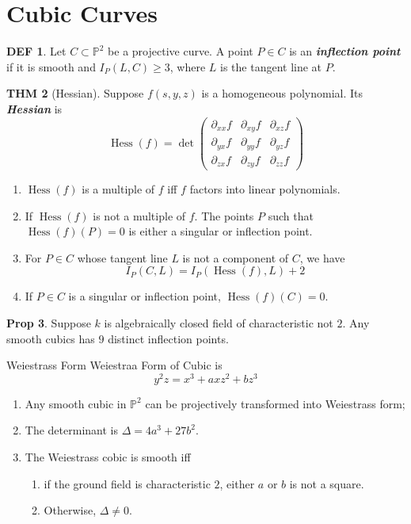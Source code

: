 \documentclass[twocolumn]{article}
\renewcommand{\emph}[1]{\textbf{\textit{#1}}}
\newcommand{\p}{\partial}
\DeclareMathOperator{\Hess}{Hess}
\renewcommand{\P}{\mathbb{P}}
\theoremstyle{definition}
\newtheorem{thm}{THM}
\newtheorem{prop}[thm]{Prop}
\newtheorem{defi}[thm]{DEF}
\theoremstyle{remark}
\begin{document}
\section{Cubic Curves}

\begin{defi}
	Let $C \subset \P^2$ be a projective curve. A point $P \in C$ is an \emph{inflection point} if it is smooth and $I_P(L, C) \geq 3$, where $L$ is the tangent line at $P$.
\end{defi}

\begin{thm}[Hessian]
	Suppose $f(s, y,z)$ is a homogeneous polynomial. 
	Its \emph{Hessian} is 
	$$
	\Hess(f) = \det 
	\begin{pmatrix}
		\p_{xx} f & \p_{xy} f & \p_{xz} f \\
		\p_{yx} f & \p_{yy} f & \p_{yz} f \\
		\p_{zx} f & \p_{zy} f & \p_{zz} f
	\end{pmatrix}
	$$
	\begin{enumerate}
		\item $\Hess(f)$ is a multiple of $f$ iff $f$ factors into linear polynomials.
		\item If $\Hess(f)$ is not a multiple of $f$. The points $P$ such that $\Hess(f)(P) = 0$ is either a singular or inflection point.
		\item For $P \in C$ whose tangent line $L$ is not a component of $C$, we have 
			$$
				I_P(C, L) = I_P(\Hess(f), L) + 2
			$$
		\item If $P \in C$ is a singular or inflection point, $\Hess(f)(C) = 0$.
	\end{enumerate}

\end{thm}

\begin{prop}
	Suppose $k$ is algebraically closed field of characteristic not $2$. 
	Any smooth cubics has $9$ distinct inflection points.
\end{prop}

\begin{fthm}{Weiestrass Form}{}
	Weiestraa Form of Cubic is 
	$$
		y^2z = x^3 + axz^2 + b z^3
	$$
	\begin{enumerate}
		\item Any smooth cubic in $\P^2$ can be projectively transformed into Weiestrass form;
		\item The determinant is $\Delta = 4a^3 + 27b^2$.
		\item The Weiestrass cobic is smooth iff 
			\begin{enumerate}
				\item  if the ground field is characteristic $2$, either $a$ or $b$ is not a square.
				\item Otherwise, $\Delta \neq 0$.
			\end{enumerate}
	\end{enumerate}
\end{fthm}
\end{document}
